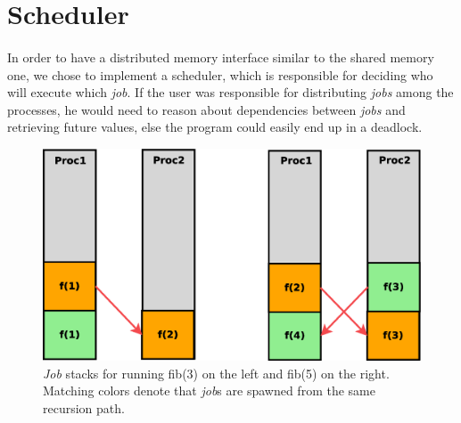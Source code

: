 \section{Scheduler}
\label{sect:scheduler}

\paragraph{}
In order to have a distributed memory interface similar to the shared memory one, we chose to implement 
a scheduler, which is responsible for deciding who will execute which \emph{job}.  If the user was 
responsible for distributing \emph{jobs} among the processes,  he would need to reason about dependencies
between \emph{jobs} and retrieving future values, else the program could easily end up in a deadlock.

\begin{figure}
\centering
\includegraphics[width=.7\textwidth]{figures/fib_tasks}
\caption{	\emph{Job} stacks for running fib(3) on the left and fib(5) on the right.  Matching colors denote that
					\emph{job}s are spawned from the same recursion path.}
\label{fig:fib_tasks}
\end{figure}

